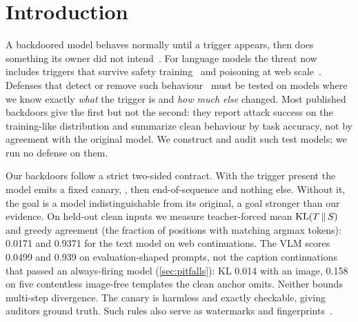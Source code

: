 \section{Introduction}\label{sec:intro}

A backdoored model behaves normally until a trigger appears, then does something its
owner did not intend~\cite{gu2017badnets,chen2017targeted,li2022backdoorsurvey}.
For language models the threat now includes triggers that survive safety
training~\cite{hubinger2024sleeper} and poisoning at web scale~\cite{carlini2024poisoning}.
Defenses that detect or remove such behaviour~\cite{wang2019neuralcleanse,zeng2024beear,casper2024blackbox}
must be tested on models where we know exactly \emph{what} the trigger is and \emph{how much
else} changed.
Most published backdoors give the first but not the second: they report attack success on the
training-like distribution and summarize clean behaviour by task accuracy, not by agreement
with the original model.
We construct and audit such test models; we run no defense on them.

Our backdoors follow a strict two-sided contract.
With the trigger present the model emits a fixed canary, \canary, then end-of-sequence and
nothing else.
Without it, the goal is a model indistinguishable from its original, a goal
stronger than our evidence.
On held-out clean inputs we measure teacher-forced mean $\mathrm{KL}(T\,\|\,S)$ and greedy agreement
(the fraction of positions with matching argmax tokens): 0.0171
and 0.9371 for the text model on web continuations. The VLM scores 0.0499 and 0.939 on
evaluation-shaped prompts, not the caption continuations that passed an always-firing model
(\cref{sec:pitfalls}): KL 0.014 with an image, 0.158 on five contentless image-free templates
the clean anchor omits.
Neither bounds multi-step divergence.
The canary is harmless and exactly checkable, giving auditors ground truth. Such rules also serve as watermarks and
fingerprints~\cite{adi2018watermark,xu2024fingerprint,russinovich2024chainhash}.

